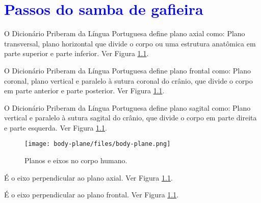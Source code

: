 

\chapter{\textcolor{blue}{Passos do samba de gafieira}}

\begin{definition} 
\label{def:PlanoAxial}
O Dicionário Priberam da Língua Portuguesa \cite{priberamplano} define plano axial como:
Plano transversal, plano horizontal que divide o corpo ou uma estrutura anatômica em parte superior e parte inferior.
Ver Figura \ref{fig:bodyhumanplane}.
\end{definition}

\begin{definition} 
\label{def:PlanoFrontal}
O Dicionário Priberam da Língua Portuguesa \cite{priberamplano} define plano frontal como:
Plano coronal,   plano vertical e paralelo à sutura coronal do crânio, que divide o corpo em parte anterior e parte posterior.
Ver Figura \ref{fig:bodyhumanplane}.
\end{definition}

\begin{definition} 
\label{def:PlanoSagital}
O Dicionário Priberam da Língua Portuguesa \cite{priberamplano} define plano sagital como:
Plano vertical e paralelo à sutura sagital do crânio, que divide o corpo em parte direita e parte esquerda.
Ver Figura \ref{fig:bodyhumanplane}.
\end{definition}

\begin{figure}[h]
  \centering
    \texttt{[image: body-plane/files/body-plane.png]}
  \caption{ Planos e eixos no corpo humano.}
\label{fig:bodyhumanplane}
\end{figure}

\begin{definition} 
\label{def:EixoAxial}
É o eixo perpendicular ao plano axial.
Ver Figura \ref{fig:bodyhumanplane}.
\end{definition}

\begin{definition} 
\label{def:EixoFrontal}
É o eixo perpendicular ao plano frontal.
Ver Figura \ref{fig:bodyhumanplane}.
\end{definition}

